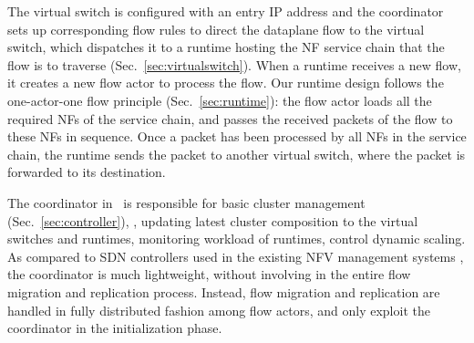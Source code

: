 The virtual switch is configured with an entry IP address and the coordinator sets up corresponding flow rules to direct the dataplane flow to the virtual switch,%
 which dispatches it to a runtime hosting the NF service chain that the flow is to traverse (Sec.~\ref{sec:virtualswitch}). When a runtime receives a new flow, it creates a new flow actor to process the flow. Our runtime design follows the one-actor-one flow principle (Sec.~\ref{sec:runtime}): the flow actor loads all the required NFs of the service chain, and passes the received packets of the flow to these NFs in sequence. %
 Once a packet has been processed by all NFs in the service chain, the runtime sends the packet to another virtual switch,
where the packet is forwarded to its destination.




The coordinator in \nfactor~is responsible for basic cluster management (Sec.~\ref{sec:controller}), \eg, updating latest cluster composition to the virtual switches and runtimes, monitoring workload of runtimes, control dynamic scaling. %
As compared to SDN controllers used in the existing NFV management systems \cite{gember2015opennf, rajagopalan2013split}%
, the coordinator is much lightweight, without involving in the entire flow migration and replication process.%
 Instead, flow migration and replication are handled in fully distributed fashion among flow actors, and only exploit the coordinator in the initialization phase.

